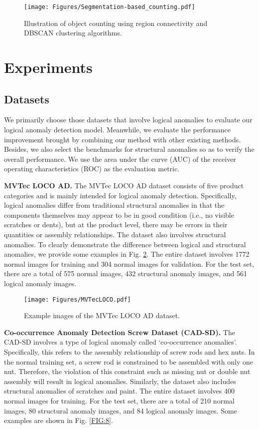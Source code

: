 \documentclass[final,5p,times,twocolumn]{elsarticle}
\begin{document}
\begin{figure}
\centering
		\texttt{[image: Figures/Segmentation-based\_counting.pdf]}\caption{Illustration of object counting using region connectivity and DBSCAN clustering algorithms.}
	\label{FIG:6}
\end{figure}

\section{Experiments}
\subsection{Datasets}
\label{4.1}
We primarily choose those datasets that involve logical anomalies to evaluate our logical anomaly detection model. Meanwhile, we evaluate the performance improvement brought by combining our method with other existing methods. Besides, we also select the benchmarks for structural anomalies so as to verify the overall performance. We use the area under the curve (AUC) of the receiver operating characteristics (ROC) as the evaluation metric.

\textbf{MVTec LOCO AD.} The MVTec LOCO AD dataset \cite{bergmann2022beyond} consists of five product categories and is mainly intended for logical anomaly detection. Specifically, logical anomalies differ from traditional structural anomalies in that the components themselves may appear to be in good condition (i.e., no visible scratches or dents), but at the product level, there may be errors in their quantities or assembly relationships. The dataset also involves structural anomalies. To clearly demonstrate the difference between logical and structural anomalies, we provide some examples in Fig. \ref{FIG:7}. The entire dataset involves 1772 normal images for training and 304 normal images for validation. For the test set, there are a total of 575 normal images, 432 structural anomaly images, and 561 logical anomaly images.

\begin{figure}
\centering
		\texttt{[image: Figures/MVTecLOCO.pdf]}\caption{Example images of the MVTec LOCO AD dataset.}
	\label{FIG:7}
\end{figure}

\textbf{Co-occurrence Anomaly Detection Screw Dataset (CAD-SD).} The CAD-SD \cite{ishida2023sa} involves a type of logical anomaly called `co-occurrence anomalies'. Specifically, this refers to the assembly relationship of screw rods and hex nuts. In the normal training set, a screw rod is constrained to be assembled with only one nut. Therefore, the violation of this constraint such as missing nut or double nut assembly will result in logical anomalies. Similarly, the dataset also includes structural anomalies of scratches and paint. The entire dataset involves 400 normal images for training. For the test set, there are a total of 210 normal images, 80 structural anomaly images, and 84 logical anomaly images. Some examples are shown in Fig. \ref{FIG:8}.
\end{document}
